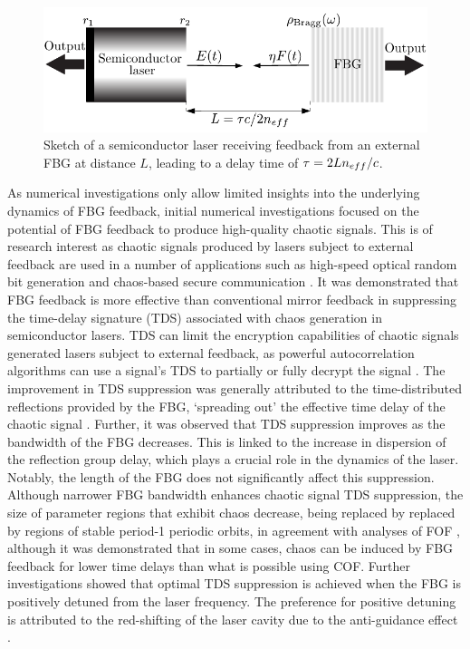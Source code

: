 %
\begin{figure}[!t]
    \centering
    
    \includegraphics[width=0.7\linewidth]{Images/Introduction/FBG_setup.pdf}
    
    \caption{Sketch of a semiconductor laser receiving feedback from an external FBG at distance $L$, leading to a delay time of $\tau=2Ln_{eff}/c$.}
    
    \label{fig:FBGF}
\end{figure}
%
\par
%
As numerical investigations only allow limited insights into the underlying dynamics of FBG feedback, initial numerical investigations focused on the potential of FBG feedback to produce high-quality chaotic signals. This is of research interest as chaotic signals produced by lasers subject to external feedback are used in a number of applications such as high-speed optical random bit generation \cite{uchida2008fast} and chaos-based secure communication \cite{annovazzi2008secure}. It was demonstrated that FBG feedback is more effective than conventional mirror feedback in suppressing the time-delay signature (TDS) associated with chaos generation in semiconductor lasers. TDS can limit the encryption capabilities of chaotic signals generated lasers subject to external feedback, as powerful autocorrelation algorithms can use a signal's TDS to partially or fully decrypt the signal \cite{rontani2007loss}. The improvement in TDS suppression was generally attributed to the time-distributed reflections provided by the FBG, `spreading out' the effective time delay of the chaotic signal \cite{li2012distributed}. Further, it was observed that TDS suppression improves as the bandwidth of the FBG decreases. This is linked to the increase in dispersion of the reflection group delay, which plays a crucial role in the dynamics of the laser. Notably, the length of the FBG does not significantly affect this suppression. Although narrower FBG bandwidth enhances chaotic signal TDS suppression, the size of parameter regions that exhibit chaos decrease, being replaced by replaced by regions of stable period-1 periodic orbits, in agreement with analyses of FOF \cite{li2020stable}, although it was demonstrated that in some cases, chaos can be induced by FBG feedback for lower time delays than what is possible using COF. Further investigations showed that optimal TDS suppression is achieved when the FBG is positively detuned from the laser frequency. The preference for positive detuning is attributed to the red-shifting of the laser cavity due to the anti-guidance effect \cite{li2015chaotic}. 
